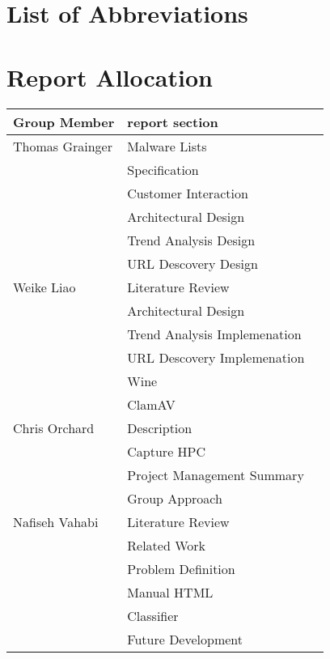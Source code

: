 
\newpage
\mbox{}
\newpage
\mbox{}
\newpage

\section{List of Abbreviations}
\renewcommand{\nomname}{}
\printnomenclature



\clearpage
\section{Report Allocation}
\label{sec:words}
\begin{center}
\begin{tabularx}{\linewidth}{|XXX|}
\hline
Group Member & report section\\ \hline
Thomas Grainger & Malware Lists\\
& Specification\\
& Customer Interaction\\
& Architectural Design\\
& Trend Analysis Design\\
& URL Descovery Design\\ \hline

Weike Liao & Literature Review \\
& Architectural Design \\
& Trend Analysis Implemenation \\
& URL Descovery Implemenation \\
& Wine \\
& ClamAV \\ \hline

Chris Orchard & Description \\
& Capture HPC \\
& Project Management Summary \\
& Group Approach \\ \hline

Nafiseh Vahabi & Literature Review  \\
& Related Work \\
& Problem Definition \\
& Manual HTML \\
& Classifier \\
& Future Development \\ \hline
\hline
\end{tabularx}
\end{center}
